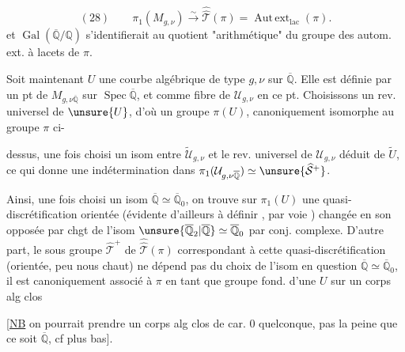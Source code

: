 \[
(28)\qquad \pi_1(M_{g,\nu})\xrightarrow{\sim}\widehat{\widehat{\mathcal T}}(\pi)
=\operatorname{Aut\,ext}_{\mathrm{lac}}(\pi).
\]
et $\operatorname{Gal}(\overline{\mathbb Q}/\mathbb Q)$ s'identifierait au quotient "arithmétique" du groupe des autom. ext. à lacets de $\pi$.

Soit maintenant $U$ une courbe algébrique de type $g,\nu$ sur $\overline{\mathbb Q}$. Elle est définie par un pt de $M_{g,\nu\overline{\mathbb Q}}$ sur $\operatorname{Spec}\overline{\mathbb Q}$, et  comme fibre de $\mathcal U_{g,\nu}$ en ce pt. Choisissons un rev. universel de $\unsure{U}$, d'où un groupe $\pi(U)$, canoniquement isomorphe au groupe $\pi$ ci-


dessus, une fois choisi un isom entre $\widetilde{\mathcal U}_{g,\nu}$ et le rev. universel de $\mathcal U_{g,\nu}$ déduit de $\widetilde U$, ce qui donne une indétermination dans $\pi_1(\mathcal U_{g,\nu\overline{\mathbb Q}})\simeq\unsure{\widehat{\mathcal S}^{+}}$.

Ainsi, une fois choisi un isom $\overline{\mathbb Q}\simeq\overline{\mathbb Q}_0$, on trouve sur $\pi_1(U)$ une quasi-discrétification orientée (évidente d'ailleurs à définir , par voie ) changée en son opposée par chgt de l'isom $\unsure{\overline{\mathbb Q}_2|\overline{\mathbb Q}}\simeq\overline{\mathbb Q}_0$ par conj. complexe. D'autre part, le sous groupe $\widehat{\mathcal T}^{+}$ de $\widehat{\widehat{\mathcal T}}(\pi)$ correspondant à cette quasi-discrétification (orientée, peu nous chaut) ne dépend pas du choix de l'isom en question $\overline{\mathbb Q}\simeq\overline{\mathbb Q}_0$, il est canoniquement associé à $\pi$ en tant que groupe fond. d'une $U$ sur  un corps alg clos

[\uline{NB} on pourrait prendre un corps alg clos de car. $0$ quelconque, pas la peine que ce soit  $\overline{\mathbb Q}$, cf plus bas].



